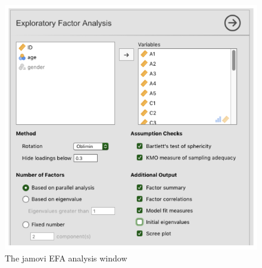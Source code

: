 \documentclass[
]{book}
\begin{document}
\begin{figure}

{\centering \includegraphics[width=1\linewidth]{img/factoranalysis/fa3} 

}

\caption{The jamovi EFA analysis window}\label{fig:fa3}
\end{figure}
\end{document}
